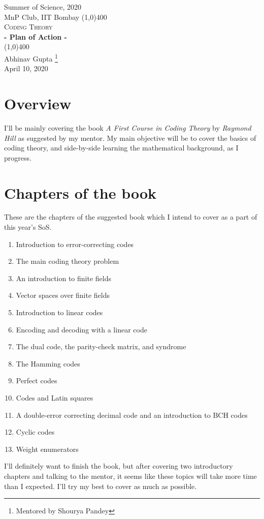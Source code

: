 \documentclass[11pt]{article}
\begin{document}
\begin{titlepage}
\begin{center}
\vspace{1cm}
\Large{\textsf{ Summer of Science, 2020 }} \\
\vspace{1.5mm}
\large{\textsf{ MnP Club, IIT Bombay }}
\vfill
\line(1,0){400} \\[2mm]
\Huge{\textsc{ Coding Theory }}\\[3mm]
\Large{\textbf{- Plan of Action -}}\\[1mm]
\line(1,0){400} \\
\vfill
\textsf{Abhinav Gupta} \footnote{ Mentored by \textsf{Shourya Pandey} }\\
\textsf{April 10, 2020} \\
\end{center}
\end{titlepage}

\section*{Overview}
I'll be mainly covering the book \textit{A First Course in Coding Theory} by \textit{Raymond Hill} as suggested by my mentor. My main objective will be to cover the basics of coding theory, and side-by-side learning the mathematical background, as I progress.

\section*{Chapters of the book}
These are the chapters of the suggested book which I intend to cover as a part of this year's SoS.
\begin{enumerate}
	\itemsep-1mm
    \item Introduction to error-correcting codes 
    \item The main coding theory problem
    \item An introduction to finite fields
    \item Vector spaces over finite fields
    \item Introduction to linear codes
    \item Encoding and decoding with a linear code
    \item The dual code, the parity-check matrix, and syndrome
    \item The Hamming codes
    \item Perfect codes
    \item Codes and Latin squares
    \item A double-error correcting decimal code and an introduction to BCH codes
    \item Cyclic codes
	\item Weight enumerators
\end{enumerate}
I'll definitely want to finish the book, but after covering two introductory chapters and talking to the mentor, it seems like these topics will take more time than I expected. I'll try my best to cover as much as possible.
\end{document}
